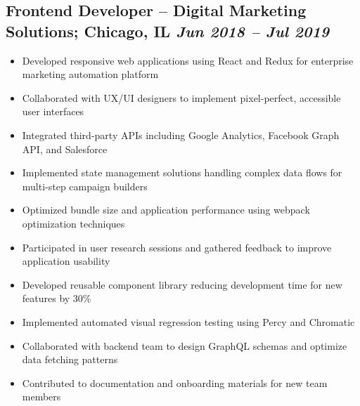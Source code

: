 \documentclass[a4paper,10pt]{article}           %
\begin{document}
    \subsection*{Frontend Developer – Digital Marketing Solutions; Chicago, IL \hfill \textit{Jun 2018 – Jul 2019}}
    \vspace{-0.5em}
    \begin{itemize}[leftmargin=0.2cm, itemsep=0pt, label=--]
        \item Developed responsive web applications using React and Redux for enterprise marketing automation platform
        \item Collaborated with UX/UI designers to implement pixel-perfect, accessible user interfaces
        \item Integrated third-party APIs including Google Analytics, Facebook Graph API, and Salesforce
        \item Implemented state management solutions handling complex data flows for multi-step campaign builders
        \item Optimized bundle size and application performance using webpack optimization techniques
        \item Participated in user research sessions and gathered feedback to improve application usability
        \item Developed reusable component library reducing development time for new features by 30\%
        \item Implemented automated visual regression testing using Percy and Chromatic
        \item Collaborated with backend team to design GraphQL schemas and optimize data fetching patterns
        \item Contributed to documentation and onboarding materials for new team members
    \end{itemize}
\end{document}
